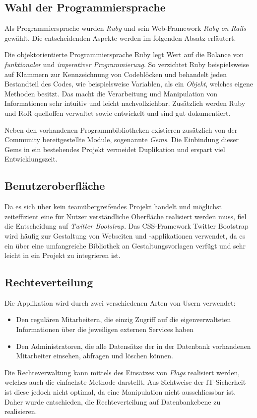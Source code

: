 
\subsection{Wahl der Programmiersprache}
\label{sec:Wahl der Programmiersprache}
Als Programmiersprache wurden \textit{Ruby} und sein Web-Framework \textit{Ruby on Rails} gewählt.
Die entscheidenden Aspekte werden im folgenden Absatz erläutert.

Die objektorientierte Programmiersprache Ruby legt Wert auf die Balance von \textit{funktionaler} und
\textit{imperativer Programmierung}. So verzichtet Ruby beispielsweise auf Klammern zur Kennzeichnung
von Codeblöcken und behandelt jeden Bestandteil des Codes, wie beispielsweise Variablen, als ein \textit{Objekt},
welches eigene Methoden besitzt. Das macht die Verarbeitung und Manipulation von Informationen sehr
intuitiv und leicht nachvollziehbar. Zusätzlich werden Ruby und \acs{RoR}
quelloffen verwaltet sowie entwickelt und sind gut dokumentiert.

Neben den vorhandenen Programmbibliotheken existieren zusätzlich von der Community bereitgestellte Module,
sogenannte \textit{Gems}. Die Einbindung dieser Gems in ein bestehendes Projekt vermeidet
Duplikation und erspart viel Entwicklungszeit.

\subsection{Benutzeroberfläche}
\label{sec:Benutzeroberfläche}
Da es sich über kein teamübergreifendes Projekt handelt und möglichst zeiteffizient
eine für Nutzer verständliche Oberfläche realisiert werden muss, fiel die Entscheidung auf
\textit{Twitter Bootstrap}.
Das CSS-Framework Twitter Bootstrap wird häufig zur Gestaltung von Webseiten und
-applikationen verwendet, da es ein über eine umfangreiche Bibliothek an Gestaltungsvorlagen
verfügt und sehr leicht in ein Projekt zu integrieren ist.

\subsection{Rechteverteilung}
\label{sec:Rechteverteilung}
Die Applikation wird durch zwei verschiedenen Arten von Usern verwendet:
\begin{itemize}
	\item Den regulären Mitarbeitern, die einzig Zugriff auf die eigenverwalteten Informationen über die jeweiligen externen Services haben
	\item Den Administratoren, die alle Datensätze der in der Datenbank vorhandenen Mitarbeiter einsehen, abfragen und löschen können.
\end{itemize}
Die Rechteverwaltung kann mittels des Einsatzes von \textit{Flags} realisiert werden, welches auch die einfachste Methode darstellt. Aus Sichtweise der IT-Sicherheit ist diese jedoch nicht optimal, da eine Manipulation nicht ausschliessbar ist. Daher wurde entschieden, die Rechteverteilung auf
Datenbankebene zu realisieren.

